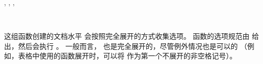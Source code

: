 \documentclass{l3doc}
\begin{document}
%
\begin{function}
{
    \NewExpandableDocumentCommand     ,
    \RenewExpandableDocumentCommand   ,
    \ProvideExpandableDocumentCommand ,
    \DeclareExpandableDocumentCommand
}
\begin{syntax}
    ~~~~  
\end{syntax}
这组函数创建的文档水平  会按照完全展开的方式收集选项。
函数的选项规范由  给出，然后会执行 。
一般而言， 也是完全展开的，尽管例外情况也是可以的
（例如，表格中使用的函数展开时，可以将  作为第一个不展开的非空格记号）。


\end{function}
\end{document}
